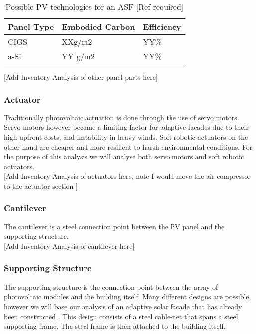 \begin{table}[H]
\centering
\begin{tabular}{lll}
Panel Type		   & Embodied Carbon        & Efficiency     \\
\hline
CIGS 				 & XXg/m2 & YY\% \\
a-Si				 & YY g/m2        & YY\%    \\
\end{tabular}
\caption{Possible PV technologies for an ASF [Ref required]}
\label{tab:PV}
\end{table}


[Add Inventory Analysis of other panel parts here]

\subsubsection*{Actuator}
Traditionally photovoltaic actuation is done through the use of servo motors. Servo motors however become a limiting factor for adaptive facades due to their high upfront costs, and instability in heavy winds. Soft robotic actuators on the other hand are cheaper and more resilient to harsh environmental conditions\cite{Svetozarevic2014a}. For the purpose of this analysis we will analyse both servo motors and soft robotic actuators. \\

[Add Inventory Analysis of actuators here, note I would move the air compressor to the actuator section ]

\subsubsection*{Cantilever}
The cantilever is a steel connection point between the PV panel and the supporting structure.\\

[Add Inventory Analysis of cantilever here]

\subsubsection*{Supporting Structure}
The supporting structure is the connection point between the array of photovoltaic modules and the building itself. Many different designs are possible, however we will base our analysis of an adaptive solar facade that has already been constructed \cite{nagy2015frontiers}. This design consists of a steel cable-net that spans a steel supporting frame. The steel frame is then attached to the building itself.\\

